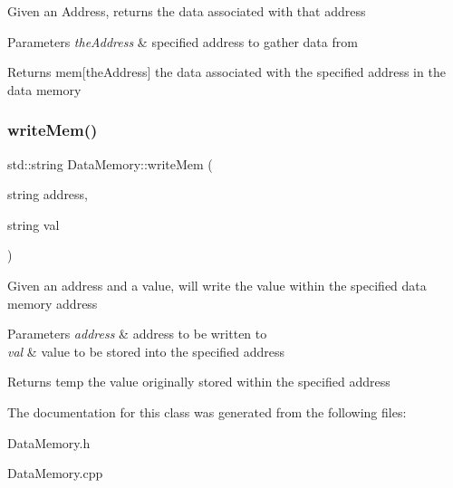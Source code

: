 Given an Address, returns the data associated with that address 
\begin{DoxyParams}{Parameters}
{\em the\+Address} & specified address to gather data from \\
\hline
\end{DoxyParams}
\begin{DoxyReturn}{Returns}
mem\mbox{[}the\+Address\mbox{]} the data associated with the specified address in the data memory 
\end{DoxyReturn}
\mbox{\label{class_data_memory_ac9c4f2b4ce44214f8043d84edd35e9c4}} 
\subsubsection{\texorpdfstring{write\+Mem()}{writeMem()}}
{\footnotesize\ttfamily std\+::string Data\+Memory\+::write\+Mem (\begin{DoxyParamCaption}\item[{string}]{address,  }\item[{string}]{val }\end{DoxyParamCaption})}

Given an address and a value, will write the value within the specified data memory address 
\begin{DoxyParams}{Parameters}
{\em address} & address to be written to \\
\hline
{\em val} & value to be stored into the specified address \\
\hline
\end{DoxyParams}
\begin{DoxyReturn}{Returns}
temp the value originally stored within the specified address 
\end{DoxyReturn}


The documentation for this class was generated from the following files\+:\begin{DoxyCompactItemize}
\item 
Data\+Memory.\+h\item 
Data\+Memory.\+cpp\end{DoxyCompactItemize}

